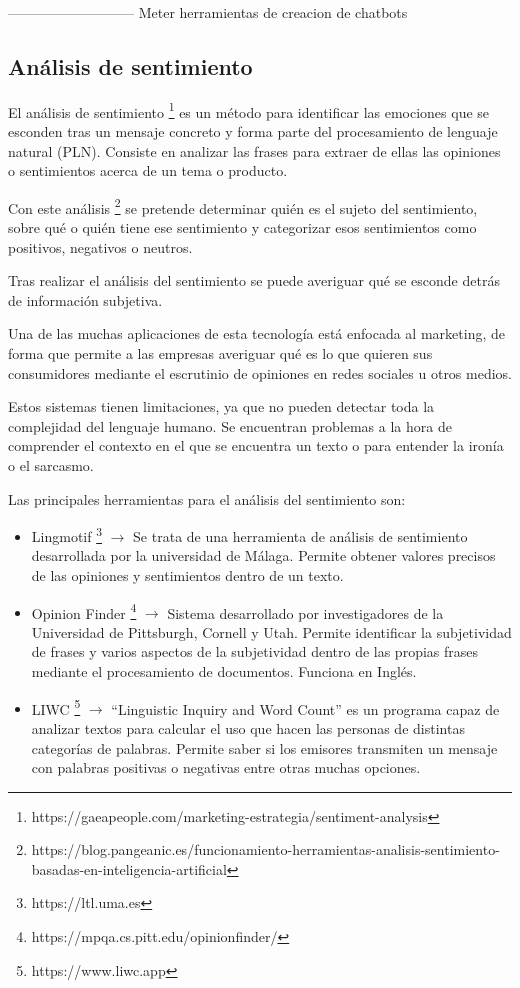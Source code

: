 --------------------------- Meter herramientas de creacion de chatbots

\subsection{Análisis de sentimiento}

El análisis de sentimiento \footnote{https://gaeapeople.com/marketing-estrategia/sentiment-analysis} es un método para identificar las emociones que se esconden tras un mensaje concreto y forma parte del procesamiento de lenguaje natural (PLN). Consiste en analizar las frases para extraer de ellas las opiniones o sentimientos acerca de un tema o producto.

Con este análisis \footnote{https://blog.pangeanic.es/funcionamiento-herramientas-analisis-sentimiento-basadas-en-inteligencia-artificial} se pretende determinar quién es el sujeto del sentimiento, sobre qué o quién tiene ese sentimiento y categorizar esos sentimientos como positivos, negativos o neutros.

Tras realizar el análisis del sentimiento se puede averiguar qué se esconde detrás de información subjetiva.

Una de las muchas aplicaciones de esta tecnología está enfocada al marketing, de forma que permite a las empresas averiguar qué es lo que quieren sus consumidores mediante el escrutinio de opiniones en redes sociales u otros medios.

Estos sistemas tienen limitaciones, ya que no pueden detectar toda la complejidad del lenguaje humano. Se encuentran problemas a la hora de comprender el contexto en el que se encuentra un texto o para entender la ironía o el sarcasmo.

Las principales herramientas para el análisis del sentimiento son:
\begin{itemize}
	\item Lingmotif \footnote{https://ltl.uma.es} $\rightarrow$ Se trata de una herramienta de análisis de sentimiento desarrollada por la universidad de Málaga. Permite obtener valores precisos de las opiniones y sentimientos dentro de un texto.
	\item Opinion Finder \footnote{https://mpqa.cs.pitt.edu/opinionfinder/} $\rightarrow$ Sistema desarrollado por investigadores de la Universidad de Pittsburgh, Cornell y Utah. Permite identificar la subjetividad de frases y varios aspectos de la subjetividad dentro de las propias frases mediante el procesamiento de documentos. Funciona en Inglés.
	\item LIWC \footnote{https://www.liwc.app} $\rightarrow$ ``Linguistic Inquiry and Word Count'' es un programa capaz de analizar textos para calcular el uso que hacen las personas de distintas categorías de palabras. Permite saber si los emisores transmiten un mensaje con palabras positivas o negativas entre otras muchas opciones.
\end{itemize}


